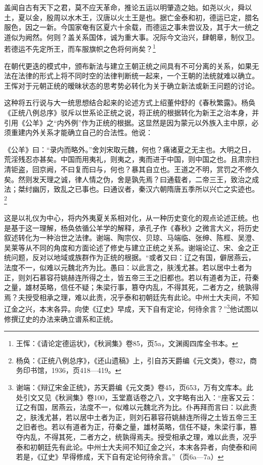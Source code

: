 \documentclass[a4paper, 12pt, openright]{ctexbook}
\renewenvironment{quote}
  {\list{}{\rightmargin2\ccwd \leftmargin2\ccwd \itemindent=2\ccwd \listparindent=2\ccwd}%
   \item\relax\small\kaishu\color{black}}
  {\endlist}
\begin{document}
\begin{quote}
盖闻自古有天下之君，莫不应天革命，推论五运以明肇造之始。如尧以火，舜以土，夏以金，殷周以水木王，汉唐以火土王是也。据亡金泰和初，德运已定，腊名服色，因之一新。今国家奄有区夏六十余载，而德运之事未尝议及，其于大一统之道似为阙然。何则？盖关系国体，诚为重大事。况际今文治兴，肆朝章，制仪卫。若德运不先定所王，而车服旗帜之色将何尚矣？\footnote{王恽：《请论定德运状》，《秋涧集》卷85，页5a，文渊阁四库全书本。}
\end{quote}

在朝代更迭的模式中，颁布新法与建立王朝正统之间具有不可分离的关系，如果无法在法律的形式上将不同时空的法律判断统一起来，一个王朝的法统就难以确立。王恽对于元朝正统的暧昧状态的思考势必转化为关于确立新法或新王问题的讨论。

这种将五行说与大一统思想结合起来的论述方式上绍董仲舒的《春秋繁露》。杨奂《正统八例总序》驳斥以世系论正统之说，将正统的根据转化为新王之治本身，并引用《公羊》之“内外例”作为正统的根据。这显然是因为蒙元以外族入主中原，必须重建内外关系才能确立自己的合法性。他说：

\begin{quote}
《公羊》曰：“录内而略外。”舍刘宋取元魏，何也？痛诸夏之无主也。大明之日，荒淫残忍亦甚矣。中国而用夷礼，则夷之，夷而进于中国，则中国之也。且肃宗扫清钜盗，回京阙，不曰复而曰与，何也？暴其自立也。王道之不明，赏罚之不修久矣。然则发天理之诚，律人情之伪，舍是孰先焉？曰通载者，二帝三王，致治之成法；桀纣幽厉，致乱之已事也。曰通议者，秦汉六朝隋唐五季所以兴亡之实迹也。\footnote{杨奂：《正统八例总序》，《还山遗稿》上，引自苏天爵编《元文类》，卷32，商务印书馆，1936，页418—419。}
\end{quote}

这是以礼仪为中心，将内外夷夏关系相对化，从一种历史变化的观点论述正统。也是基于这一理解，杨奂依循公羊学的解释，承孔子作《春秋》之微言大义，将历史叙述转化为一种治世之法律。谢端、陶宗仪、贝琼、马端临、张绅、陈桱、吴澄、吴莱等从不同的角度和方面论述了修史与建立正统之关系。谢端论辽、宋、金之正统问题，反对以地域或族群作为正统的根据。“或者又曰：辽之有国，僻居燕云，法度不一，似难以元魏北齐为比。愚曰：以此言之，肤浅尤甚。若以居中土者为正，则刘石慕容苻姚赫连所得之土，皆五帝三王之旧都也。若以有道者为正，苻秦之量，雄材英略，信任不疑；朱梁行事，篡夺内乱，不得其死，二者方之，统孰得焉？夫授受相承之理，难以此责，况乎泰和初朝廷先有此论。中州士大夫间，不知辽金之兴，本末各异。向使《辽史》早成，天下自有定论，何待余言？”\footnote{谢端：《辩辽宋金正统》，苏天爵编《元文类》卷45，页653，万有文库本。此处引文又见《秋涧集》卷100，玉堂嘉话卷之八，文字略有出入：“座客又云：辽之有国，居燕云，法度不一，似难以元魏北齐为比。仆再拜而言曰：以此责之，肤浅尤甚，若以居中土者为正，则刘石慕容苻姚赫连所得之土皆五帝三王之旧者也。若以有道者为正，苻秦之量，雄材英略，信任不疑，朱梁行事，篡夺内乱，不得其死，二者方之，统孰得焉夫。授受相承之理，难以此责，况乎泰和初朝廷先有此论。中州士大夫间不知辽金之兴，本末各异者，向使泰和间若是，《辽史》早得修成，天下自有定论何待余言。”（页6a—7a）}他试图以修撰辽史的办法来确立谱系和正统。
\end{document}
